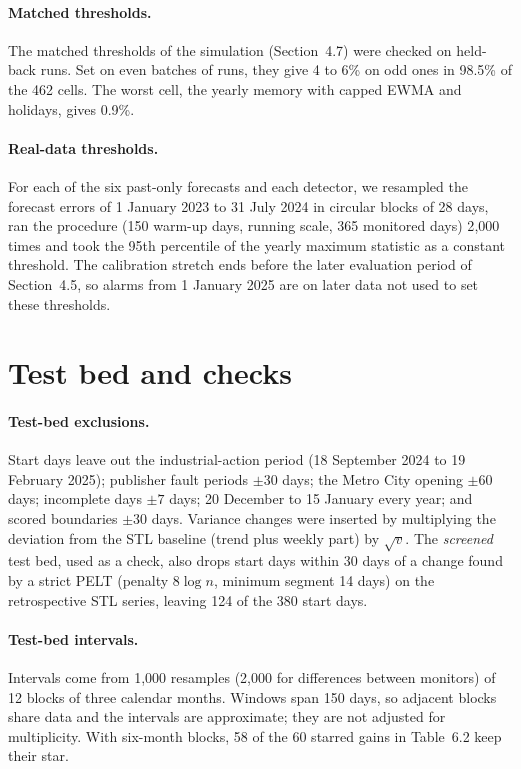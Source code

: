 \paragraph{Matched thresholds.} The matched thresholds of the simulation (Section~4.7) were checked on held-back runs. Set on even batches of runs, they give 4 to 6\% on odd ones in 98.5\% of the 462 cells. The worst cell, the yearly memory with capped EWMA and holidays, gives 0.9\%.

\paragraph{Real-data thresholds.} For each of the six past-only forecasts and each detector, we resampled the forecast errors of 1 January 2023 to 31 July 2024 in circular blocks of 28 days, ran the procedure (150 warm-up days, running scale, 365 monitored days) 2{,}000 times and took the 95th percentile of the yearly maximum statistic as a constant threshold. The calibration stretch ends before the later evaluation period of Section~4.5, so alarms from 1 January 2025 are on later data not used to set these thresholds.

\section{Test bed and checks}\label{app:d-checks}

\paragraph{Test-bed exclusions.} Start days leave out the industrial-action period (18 September 2024 to 19 February 2025); publisher fault periods $\pm30$ days; the Metro City opening $\pm60$ days; incomplete days $\pm7$ days; 20 December to 15 January every year; and scored boundaries $\pm30$ days. Variance changes were inserted by multiplying the deviation from the STL baseline (trend plus weekly part) by $\sqrt{v}$. The \emph{screened} test bed, used as a check, also drops start days within 30 days of a change found by a strict PELT (penalty $8\log n$, minimum segment 14 days) on the retrospective STL series, leaving 124 of the 380 start days.

\paragraph{Test-bed intervals.} Intervals come from 1,000 resamples (2,000 for differences between monitors) of 12 blocks of three calendar months. Windows span 150 days, so adjacent blocks share data and the intervals are approximate; they are not adjusted for multiplicity. With six-month blocks, 58 of the 60 starred gains in Table~6.2 keep their star.


